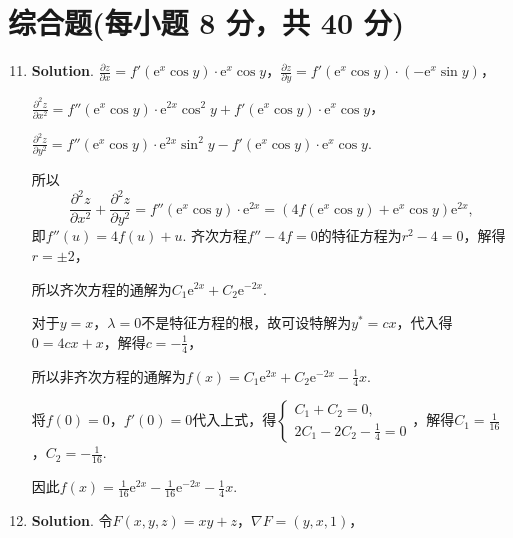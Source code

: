 \documentclass[../main.tex]{subfiles}
\begin{document}
\section{综合题(每小题 8 分，共 40 分)}
\begin{enumerate}
    \setcounter{enumi}{10}
    \item \textbf{Solution}. $\frac{\partial z}{\partial x}= f'\left(\mathrm{e}
              ^{x}\cos y\right)\cdot \mathrm{e}^{x}\cos y$，$\frac{\partial z}{\partial
                  y}= f'\left(\mathrm{e}^{x}\cos y\right)\cdot \left(-\mathrm{e}^{x}\sin y\right
              )$，

          $\frac{\partial^{2} z}{\partial x^{2}}= f''\left(\mathrm{e}^{x}\cos y\right
              )\cdot \mathrm{e}^{2x}\cos^{2} y + f'\left(\mathrm{e}^{x}\cos y\right)\cdot
              \mathrm{e}^{x}\cos y$，

          $\frac{\partial^{2} z}{\partial y^{2}}= f''\left(\mathrm{e}^{x}\cos y\right
              )\cdot \mathrm{e}^{2x}\sin^{2} y - f'\left(\mathrm{e}^{x}\cos y\right)\cdot
              \mathrm{e}^{x}\cos y$.

          所以
          \[
              \frac{\partial^{2} z}{\partial x^{2}}+\frac{\partial^{2} z}{\partial
                  y^{2}}= f''\left(\mathrm{e}^{x}\cos y\right)\cdot \mathrm{e}^{2x}= \left(4f
              \left(\mathrm{e}^{x}\cos y\right)+\mathrm{e}^{x}\cos y\right)\mathrm{e}^{2x},
          \]
          即$f''(u) = 4f(u)+u$. 齐次方程$f''-4f=0$的特征方程为$r^{2}-4=0$，解得$r=\pm 2$，

          所以齐次方程的通解为$C_{1}\mathrm{e}^{2x}+C_{2}\mathrm{e}^{-2x}$.

          对于$y=x$，$\lambda = 0$不是特征方程的根，故可设特解为$y^{*}=cx$，代入得$0 =
              4cx + x$，解得$c=-\frac{1}{4}$，

          所以非齐次方程的通解为$f(x) = C_{1}\mathrm{e}^{2x}+C_{2}\mathrm{e}^{-2x}-\frac{1}{4}
              x$.

          将$f(0)=0$，$f'(0)=0$代入上式，得$\begin{cases}
                  C_{1}+C_{2}=0, \\
                  2C_{1}-2C_{2}-\frac{1}{4}=0
              \end{cases}$，解得$C_{1}=\frac{1}{16}$，$C_{2}=-\frac{1}{16}$.

          因此$f(x) = \frac{1}{16}\mathrm{e}^{2x}-\frac{1}{16}\mathrm{e}^{-2x}-\frac{1}{4}
              x$.

    \item \textbf{Solution}. 令$F(x,y,z) = xy+z$，$\nabla F = (y,x,1)$，


\end{enumerate}
\end{document}
